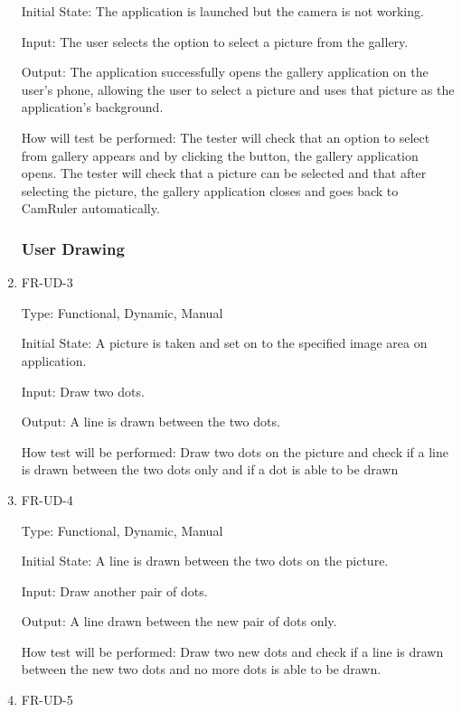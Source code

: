 \documentclass[12pt, titlepage]{article}
\begin{document}
\begin{enumerate}
                    Initial State: The application is launched but the camera is not working.

                    Input: The user selects the option to select a picture from the gallery.

                    Output: The application successfully opens the gallery application on the user's phone, allowing the user to select a picture and uses that picture as the application's background.

                    How will test be performed: The tester will check that an option to select from gallery appears and by clicking the button, the gallery application opens. The tester will check that a picture can be selected and that after selecting the picture, the gallery application closes and goes back to CamRuler automatically.
	
\subsubsection{User Drawing}	
					\item{FR-UD-3\\}
					
					Type: Functional, Dynamic, Manual
					
					Initial State: A picture is taken and set on to the specified image area on application.
					
					Input: Draw two dots. 
					
					Output: A line is drawn between the two dots.
					
					How test will be performed: Draw two dots on the picture and check if a line is drawn between the two dots only and if a dot is able to be drawn
					
					
					\item{FR-UD-4\\}
					
					Type: Functional, Dynamic, Manual
					
					Initial State: A line is drawn between the two dots on the picture.
					
					Input: Draw another pair of dots. 
					
					Output: A line drawn between the new pair of dots only.
					
					How test will be performed: Draw two new dots and check if a line is drawn between the new two dots and no more dots is able to be drawn. 
					
					\item{FR-UD-5\\}
					

\end{enumerate}
\end{document}
